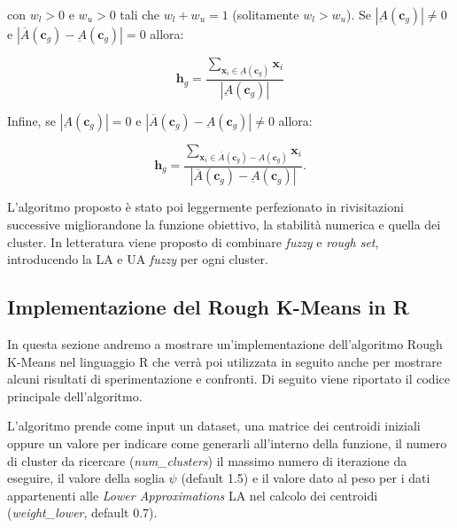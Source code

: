 \documentclass[12pt]{article}
\begin{document}
con $w_l > 0$ e $w_u > 0$ tali che $w_l + w_u = 1$ (solitamente $w_l > w_u$). Se $|\underbar{A}(\mathbf{c}_g)| \neq 0$ e $|\overline{A}(\mathbf{c}_{g})-\underbar{A}(\mathbf{c}_g)| = 0$ allora:

\begin{equation}
	\mathbf{h}_g = \frac{\sum_{\mathbf{x}_i \in \underbar{A}(\mathbf{c}_g)} \mathbf{x}_i}{|\underbar{A}(\mathbf{c}_g)|}
	\label{eq:11}
\end{equation}

Infine, se $|\underbar{A}(\mathbf{c}_g)| = 0$ e $|\overline{A}(\mathbf{c}_{g})-\underbar{A}(\mathbf{c}_g)| \neq 0$ allora:

\begin{equation}
	\mathbf{h}_g = \frac{\sum_{\mathbf{x}_i \in \overline{A}(\mathbf{c}_{g})-\underbar{A}(\mathbf{c}_g)} \mathbf{x}_i}{|\overline{A}(\mathbf{c}_{g})-\underbar{A}(\mathbf{c}_g)|}.
	\label{eq:12}
\end{equation}

L'algoritmo proposto è stato poi leggermente perfezionato in rivisitazioni successive migliorandone la funzione obiettivo, la stabilità numerica e quella dei cluster. In letteratura viene proposto di combinare \textit{fuzzy} e \textit{rough set}, introducendo la LA e UA \textit{fuzzy} per ogni cluster.

\subsection{Implementazione del Rough K-Means in R}

In questa sezione andremo a mostrare un'implementazione dell'algoritmo Rough K-Means nel linguaggio R che verrà poi utilizzata in seguito anche per mostrare alcuni risultati di sperimentazione e confronti. Di seguito viene riportato il codice principale dell'algoritmo.



L'algoritmo prende come input un dataset, una matrice dei centroidi iniziali oppure un valore per indicare come generarli all'interno della funzione, il numero di cluster da ricercare (\textit{num\_clusters}) il massimo numero di iterazione da eseguire, il valore della soglia $\psi$ (default 1.5) e il valore dato al peso per i dati appartenenti alle \textit{Lower Approximations} LA nel calcolo dei centroidi (\textit{weight\_lower}, default 0.7).
\end{document}
